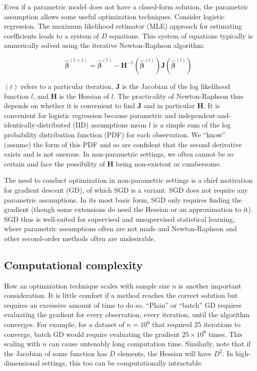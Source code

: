 \documentclass{report}
\begin{document}
Even if a parametric model does not have a closed-form solution, the parametric
assumption allows some useful optimization techniques. Consider logistic
regression. The maximum likelihood estimator (MLE) approach for estimating
coefficients leads to a system of $D$ equations. This system of
equations typically is numerically solved using the iterative Newton-Raphson
algorithm:

$$
\hat{\bm{\beta}}^{(t+1)} = \hat{\bm{\beta}}^{(t)} -
\bm{H}^{-1}(\hat{\bm{\beta}}^{(t)})\bm{J}(\hat{\bm{\beta}}^{(t)})
$$

$(t)$ refers to a particular iteration, $\bm{J}$ is the Jacobian of the
log likelihood function $l$,
and $\bm{H}$ is the Hessian of $l$. The practicality of Newton-Raphson thus depends on whether it is convenient to
find $\bm{J}$ and in particular $\bm{H}$. It is convenient for logistic regression
because parametric and independent-and-identically-distributed (IID) assumptions
mean $l$ is a simple sum of the log probability distribution
function (PDF) for each observation. We ``know'' (assume) the form of this PDF and so are
confident that the second derivative exists and is not onerous.
In non-parametric settings, we often cannot be so certain and face the possibility of
$\bm{H}$ being non-existent or cumbersome.

The need to conduct optimization in non-parametric settings is a chief
motivation for gradient descent (GD), of which SGD is a variant. SGD does not require any parametric assumptions. 
In its most basic form, SGD only requires finding the gradient (though some extensions
do need the Hessian or an approximation to it). 
SGD thus is well-suited for supervised and unsupervised statistical
learning, where parametric assumptions often are not made and 
Newton-Raphson and other second-order methods often are undesirable. 

\subsection{Computational complexity}

How an optimization technique scales with sample size $n$ is another important
consideration. It is little comfort if a method reaches the correct solution but
requires an excessive amount of time to do so. ``Plain'' or
``batch'' GD requires evaluating the gradient for every observation,
every iteration, until the algorithm converges. For example, for a
dataset of $n=10^6$ that required 25 iterations to converge, batch GD would require 
evaluating the gradient $25 \times 10^6$ times. This scaling with
$n$ can cause untenably long computation time. Similarly, note that if the
Jacobian of some function has $D$ elements, the Hessian will have $D^2$. In
high-dimensional settings, this too can be computationally intractable.
\end{document}
